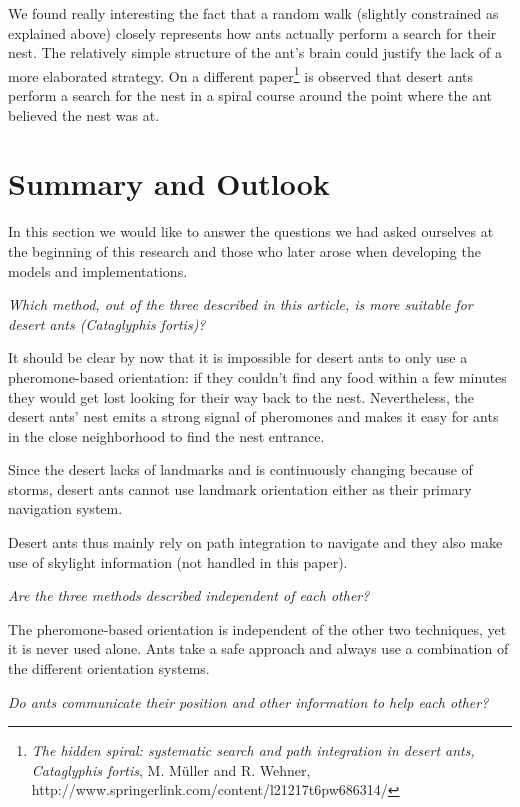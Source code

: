 \documentclass[11pt]{article}
\begin{document}
We found really interesting the fact that a random walk (slightly constrained as explained above) closely represents how ants actually perform a search for their nest. The relatively simple structure of the ant's brain could justify the lack of a more elaborated strategy. On a different paper\footnote{\emph{The hidden spiral: systematic search and path integration in desert ants, Cataglyphis fortis}, M. M\"{u}ller and R. Wehner, http://www.springerlink.com/content/l21217t6pw686314/} is observed that desert ants perform a search for the nest in a spiral course around the point where the ant believed the nest was at.
\newpage
\section{Summary and Outlook}

In this section we would like to answer the questions we had asked ourselves at the beginning of this research and those who later arose when developing the models and implementations.

\begin{center}
	\emph{Which method, out of the three described in this article, is more suitable for desert ants (Cataglyphis fortis)?}
\end{center}
It should be clear by now that it is impossible for desert ants to only use a pheromone-based orientation: if they couldn't find any food within a few minutes they would get lost looking for their way back to the nest. Nevertheless, the desert ants' nest emits a strong signal of pheromones and makes it easy for ants in the close neighborhood to find the nest entrance.

Since the desert lacks of landmarks and is continuously changing because of storms, desert ants cannot use landmark orientation either as their primary navigation system.

Desert ants thus mainly rely on path integration to navigate and they also make use of skylight information (not handled in this paper).

\begin{center}
	\emph{Are the three methods described independent of each other?}
\end{center}

The pheromone-based orientation is independent of the other two techniques, yet it is never used alone. Ants take a safe approach and always use a combination of the different orientation systems.

\begin{center}
	\emph{Do ants communicate their position and other information to help each other?}
\end{center}
\end{document}
